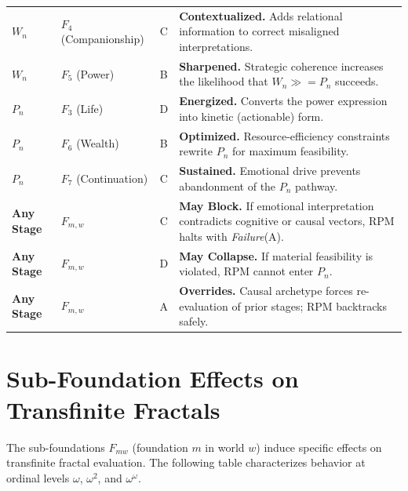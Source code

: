 \begin{longtable}{p{2cm}|p{2cm}|c|p{5.5cm}}
$W_n$ & $F_4$ (Companionship) & C
& \textbf{Contextualized.} Adds relational information to correct misaligned interpretations. \\

$W_n$ & $F_5$ (Power) & B
& \textbf{Sharpened.} Strategic coherence increases the likelihood that $W_n \gg= P_n$ succeeds. \\

\midrule

$P_n$ & $F_3$ (Life) & D
& \textbf{Energized.} Converts the power expression into kinetic (actionable) form. \\

$P_n$ & $F_6$ (Wealth) & B
& \textbf{Optimized.} Resource-efficiency constraints rewrite $P_n$ for maximum feasibility. \\

$P_n$ & $F_7$ (Continuation) & C
& \textbf{Sustained.} Emotional drive prevents abandonment of the $P_n$ pathway. \\

\midrule

\textbf{Any Stage} & $F_{m,w}$ & C
& \textbf{May Block.} If emotional interpretation contradicts cognitive or causal vectors, RPM halts with \emph{Failure}(A). \\

\textbf{Any Stage} & $F_{m,w}$ & D
& \textbf{May Collapse.} If material feasibility is violated, RPM cannot enter $P_n$. \\

\textbf{Any Stage} & $F_{m,w}$ & A
& \textbf{Overrides.} Causal archetype forces re-evaluation of prior stages; RPM backtracks safely. \\

\end{longtable}

\section{Sub-Foundation Effects on Transfinite Fractals}

The sub-foundations $F_{mw}$ (foundation $m$ in world $w$) induce specific
effects on transfinite fractal evaluation. The following table characterizes
behavior at ordinal levels $\omega$, $\omega^2$, and $\omega^\omega$.

